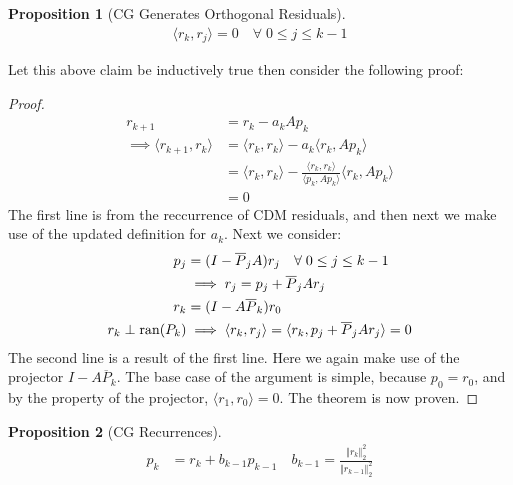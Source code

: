 \documentclass[]{article}
\theoremstyle{definition}
\newtheorem{prop}{Proposition}[section]  %
\begin{document}
            \begin{prop}[CG Generates Orthogonal Residuals]\label{prop:CG_Generates_Orthogonal_Residuals}
                \begin{align}
                    \langle r_k , r_j \rangle = 0 \quad \forall\; 0 \le j \le k - 1 
                \end{align}
            \end{prop}
            \noindent
            Let this above claim be inductively true then consider the following proof: 
            \begin{proof}
                \begin{align}
                    r_{k + 1} &= r_k - a_kAp_k
                    \\
                    \implies 
                    \langle r_{k + 1}, r_k\rangle &= \langle r_k, r_k\rangle - 
                    a_k \langle r_k, Ap_k\rangle
                    \\
                    &= \langle r_k, r_k\rangle - 
                    \frac{\langle r_k, r_k\rangle}{\langle p_k, Ap_k\rangle}
                    \langle r_k, Ap_k\rangle
                    \\
                    &= 
                    0
                \end{align}
                The first line is from the reccurrence of CDM residuals, and then next we make use of the updated definition for $a_k$. Next we consider: 
                \begin{align}
                    p_j &= (I - \overline{P}_jA)r_j \quad \forall\; 0\le j \le k - 1
                    \\
                    \hspace{1.1em} & \implies r_j = p_j + \overline{P}_jAr_j
                    \\
                    r_k &= (I - A\overline{P}_k)r_0
                    \\
                    r_k\perp \text{ran}(P_k) & \implies 
                    \langle r_k, r_j\rangle =\langle r_k, p_j + \overline{P}_jAr_j\rangle = 0
                \end{align}
                The second line is a result of the first line. Here we again make use of the projector $I - A \overline{P}_k$. The base case of the argument is simple, because $p_0 = r_0$, and by the property of the projector, $\langle r_1, r_0\rangle = 0$. The theorem is now proven. 
            \end{proof}
            \begin{prop}[CG Recurrences]\label{prop:CG_Recurrences}
                \begin{align}
                    p_k &= r_k + b_{k - 1}p_{k - 1} \quad b_{k - 1} = \frac{\Vert r_k\Vert_2^2}
                    {\Vert r_{k - 1}\Vert_2^2}
                \end{align}
            \end{prop}
\end{document}
